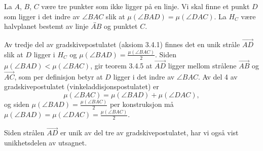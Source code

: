 
\begin{oppgave}[3.4.1]
    La $A$, $B$, $C$ være tre punkter som ikke ligger på en linje. Vi skal finne et punkt $D$ som 
    ligger i det indre av $\angle BAC$ slik at $\mu(\angle BAD)=\mu(\angle DAC)$. La $H_C$ være 
    halvplanet bestemt av linje $\overleftrightarrow{AB}$ og punktet $C$. 
    
    Av tredje del av gradskivepostulatet (aksiom 3.4.1) finnes det en unik stråle $\overrightarrow{AD}$ 
    slik at $D$ ligger i $H_C$ og $\mu(\angle BAD) = \frac{\mu(\angle BAC)}{2}$. Siden 
    $\mu(\angle BAD) < \mu(\angle BAC)$, gir teorem 3.4.5 at $\overrightarrow{AD}$ ligger mellom strålene
    $\overrightarrow{AB}$ og $\overrightarrow{AC}$, som per definisjon betyr at $D$ ligger i det indre av
    $\angle BAC$. Av del 4 av gradskivepostulatet (vinkeladdisjonspostulatet) er 
    $$\mu(\angle BAC) = \mu(\angle BAD)+\mu(\angle DAC),$$
    og siden $\mu(\angle BAD) = \frac{\mu(\angle BAC)}{2}$ per konstruksjon må 
    $\mu(\angle BAD) = \mu(\angle DAC) = \frac{\mu(\angle BAC)}{2}$. 
    
    Siden strålen $\overrightarrow{AD}$ er unik av del tre av gradskivepostulatet, har vi også vist 
    unikhetsdelen av utsagnet. 
\end{oppgave}

